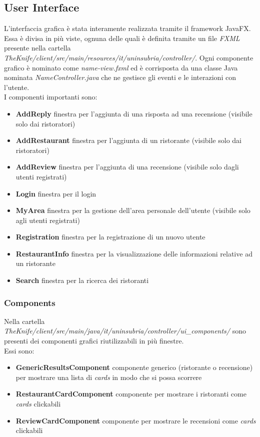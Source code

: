 \subsection{User Interface}
L'interfaccia grafica è stata interamente realizzata tramite 
il framework JavaFX.
Essa è divisa in più viste, ognuna delle quali è definita 
tramite un file \textit{FXML} presente nella cartella 
\textit{TheKnife/client/src/main/resources/it/uninsubria/controller/}.
Ogni componente grafico è nominato come \textit{name-view.fxml} ed 
è corrisposta da una classe Java nominata \textit{NameController.java}
che ne gestisce gli eventi e le interazioni con l'utente.\\
I componenti importanti sono:
\begin{itemize}
    \item  \textbf{AddReply} finestra per l'aggiunta di una risposta ad una recensione (visibile solo dai ristoratori)
    \item  \textbf{AddRestaurant} finestra per l'aggiunta di un ristorante (visibile solo dai ristoratori)
    \item  \textbf{AddReview} finestra per l'aggiunta di una recensione (visibile solo dagli utenti registrati)
    \item  \textbf{Login} finestra per il login
    \item  \textbf{MyArea} finestra per la gestione dell'area personale dell'utente (visibile solo agli utenti registrati)
    \item  \textbf{Registration} finestra per la registrazione di un nuovo utente
    \item  \textbf{RestaurantInfo} finestra per la visualizzazione delle informazioni relative ad un ristorante
    \item  \textbf{Search} finestra per la ricerca dei ristoranti
\end{itemize}

\subsubsection{Components}
Nella cartella 
\textit{TheKnife/client/src/main/java/it/uninsubria/controller/ui\_components/}
sono presenti dei componenti grafici riutilizzabili in più finestre.\\
Essi sono:
\begin{itemize}
    \item \textbf{GenericResultsComponent} componente generico (ristorante o recensione) per mostrare una lista di \textit{cards} in modo che si possa scorrere
    \item \textbf{RestaurantCardComponent} componente per mostrare i ristoranti come \textit{cards} clickabili
    \item \textbf{ReviewCardComponent} componente per mostrare le recensioni come \textit{cards} clickabili
\end{itemize}


